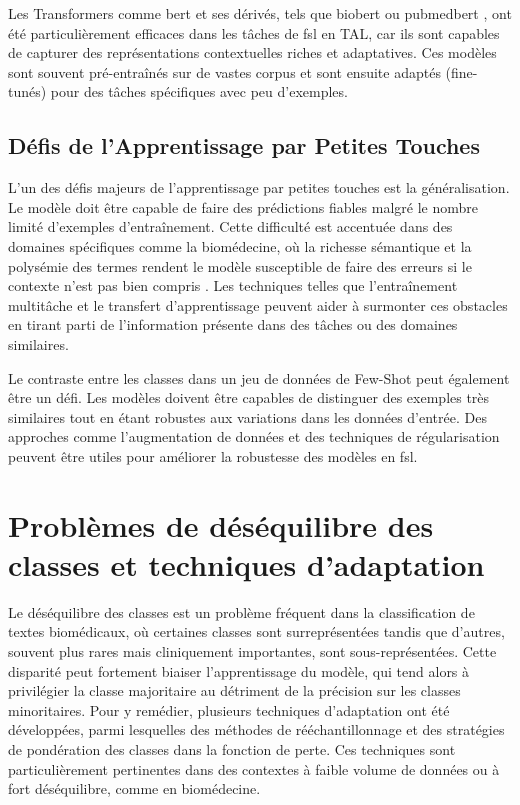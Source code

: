 \documentclass[12pt]{report}
\begin{document}
Les Transformers comme \gls{bert} \cite{devlin2019bert} et ses dérivés, tels que \gls{biobert} \cite{lee2020biobert} ou \gls{pubmedbert} \cite{lu2020pubmedbert}, ont été particulièrement efficaces dans les tâches de \gls{fsl} en TAL, car ils sont capables de capturer des représentations contextuelles riches et adaptatives. Ces modèles sont souvent pré-entraînés sur de vastes corpus et sont ensuite adaptés (fine-tunés) pour des tâches spécifiques avec peu d'exemples.

\subsection{Défis de l'Apprentissage par Petites Touches}

L'un des défis majeurs de l'apprentissage par petites touches est la généralisation. Le modèle doit être capable de faire des prédictions fiables malgré le nombre limité d'exemples d'entraînement. Cette difficulté est accentuée dans des domaines spécifiques comme la biomédecine, où la richesse sémantique et la polysémie des termes rendent le modèle susceptible de faire des erreurs si le contexte n'est pas bien compris \cite{jin2019recurrent, zhang2020biowordvec}. Les techniques telles que l'entraînement multitâche et le transfert d'apprentissage peuvent aider à surmonter ces obstacles en tirant parti de l'information présente dans des tâches ou des domaines similaires.

Le contraste entre les classes dans un jeu de données de Few-Shot peut également être un défi. Les modèles doivent être capables de distinguer des exemples très similaires tout en étant robustes aux variations dans les données d'entrée. Des approches comme l'augmentation de données et des techniques de régularisation peuvent être utiles pour améliorer la robustesse des modèles en \gls{fsl}. 

\section{Problèmes de déséquilibre des classes et techniques d’adaptation}
\label{sec:class-imbalance}

Le déséquilibre des classes est un problème fréquent dans la classification de textes biomédicaux, où certaines classes sont surreprésentées tandis que d’autres, souvent plus rares mais cliniquement importantes, sont sous-représentées. Cette disparité peut fortement biaiser l’apprentissage du modèle, qui tend alors à privilégier la classe majoritaire au détriment de la précision sur les classes minoritaires. Pour y remédier, plusieurs techniques d’adaptation ont été développées, parmi lesquelles des méthodes de rééchantillonnage et des stratégies de pondération des classes dans la fonction de perte. Ces techniques sont particulièrement pertinentes dans des contextes à faible volume de données ou à fort déséquilibre, comme en biomédecine.
\end{document}
